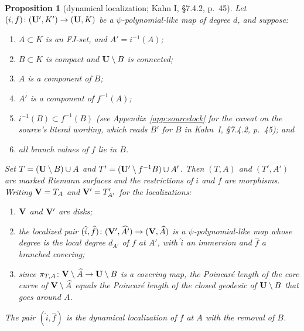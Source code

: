 \documentclass[11pt,reqno]{amsart}
\newtheorem{proposition}[theorem]{Proposition}
\theoremstyle{definition}
\theoremstyle{remark}
\begin{document}
\begin{proposition}[dynamical localization; Kahn I, \S7.4.2, p.~45]\label{prop:kahn-dynamical-localization}
Let \((i,f)\colon(\mathbf{U}',K')\to(\mathbf{U},K)\) be a \(\psi\)-polynomial-like
map of degree \(d\), and suppose:
\begin{enumerate}
\item \(A\subset K\) is an FJ-set, and \(A'=i^{-1}(A)\);
\item \(B\subset K\) is compact and \(\mathbf{U}\setminus B\) is connected;
\item \(A\) is a component of \(B\);
\item \(A'\) is a component of \(f^{-1}(A)\);
\item \(i^{-1}(B)\subset f^{-1}(B)\) (see Appendix~\ref{app:sourcelock}
for the caveat on the source's literal wording, which reads \(B'\) for
\(B\) in Kahn~I, \S7.4.2, p.~45); and
\item all branch values of \(f\) lie in \(B\).
\end{enumerate}
Set \(T=(\mathbf{U}\setminus B)\cup A\) and \(T'=(\mathbf{U}'\setminus f^{-1}B)\cup A'\).  Then
\((T,A)\) and \((T',A')\) are marked Riemann surfaces and the
restrictions of \(i\) and \(f\) are morphisms.  Writing \(\mathbf{V}=T_A\)
and \(\mathbf{V}'=T'_{A'}\) for the localizations:
\begin{enumerate}
\item[(a)] \(\mathbf{V}\) and \(\mathbf{V}'\) are disks;
\item[(b)] the localized pair
\((\widehat i,\widehat f)\colon(\mathbf{V}',\widehat{A'})\to(\mathbf{V},\widehat A)\)
is a \(\psi\)-polynomial-like map whose degree is the local degree
\(d_{A'}\) of \(f\) at \(A'\), with \(\widehat i\) an immersion and
\(\widehat f\) a branched covering;
\item[(c)] since
\(\pi_{T,A}\colon\mathbf{V}\setminus\widehat A\to\mathbf{U}\setminus B\) is a covering map, the
Poincar\'e length of the core curve of \(\mathbf{V}\setminus\widehat A\) equals the
Poincar\'e length of the closed geodesic of \(\mathbf{U}\setminus B\) that goes
around \(A\).
\end{enumerate}
The pair \((\widehat i,\widehat f)\) is the \emph{dynamical
localization of \(f\) at \(A\) with the removal of \(B\)}.
\end{proposition}
\end{document}
